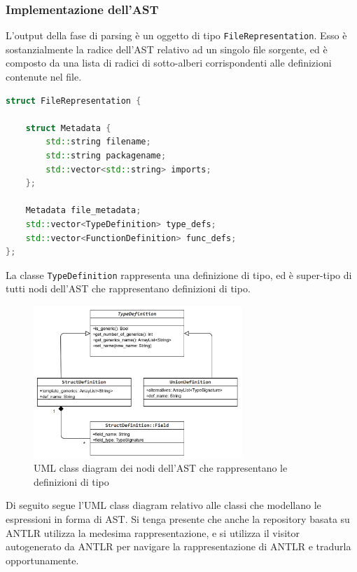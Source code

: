 \subsubsection{Implementazione dell'AST}
L'output della fase di parsing è un oggetto di tipo \texttt{FileRepresentation}. Esso 
è sostanzialmente la radice dell'AST relativo ad un singolo file sorgente, ed è 
composto da una lista di radici di sotto-alberi corrispondenti alle definizioni contenute 
nel file. \\

\vspace{0.5cm}
\begin{lstlisting}[language=C++, frame=single]
struct FileRepresentation {

    struct Metadata {
        std::string filename;
        std::string packagename;
        std::vector<std::string> imports;
    };

    Metadata file_metadata;
    std::vector<TypeDefinition> type_defs;
    std::vector<FunctionDefinition> func_defs;
};
\end{lstlisting}
\vspace{0.5cm}

La classe \texttt{TypeDefinition} rappresenta una definizione di tipo, ed è super-tipo
di tutti nodi dell'AST che rappresentano definizioni di tipo. \\

\begin{figure}[H]
    \centering
        \includegraphics[width=0.7\textwidth]{../../Assets/TypeDefAST.png}
    \caption{
        \centering
        UML class diagram dei nodi dell'AST che rappresentano le definizioni di tipo
    }
\end{figure}

\newpage

Di seguito segue l'UML class diagram relativo alle classi che modellano 
le espressioni in forma di AST. Si tenga presente che anche la repository
basata su ANTLR utilizza la medesima rappresentazione, e si utilizza il visitor 
autogenerato da ANTLR per navigare la rappresentazione di ANTLR e tradurla opportunamente.

